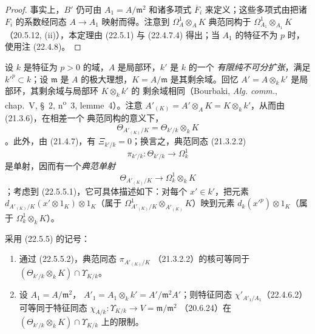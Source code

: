 \begin{proof}
事实上，$B'$ 仍可由 $A_1=A/\mathfrak m^2$ 和诸多项式
$\overline F_i$ 来定义；这些多项式由把诸 $F_i$ 的系数经同态
$A\longrightarrow A_1$ 映射而得。注意到 $\Omega^1_A\otimes_AK$ 典范同构于
$\Omega^1_{A_1}\otimes_{A_1}K$（20.5.12, (ii)），本定理由 (22.5.1)
与 (22.4.7.4) 得出；当 $A_1$ 的特征不为 $p$ 时，使用注 (22.4.8)。
\end{proof}


\begin{env}[22.5.5]
\label{0.22.5.5-fr}
设 $k$ 是特征为 $p>0$ 的域，$A$ 是局部环，$k'$ 是 $k$ 的一个
\emph{有限纯不可分扩张}，满足 $k'^p\subset k$；设 $\mathfrak m$ 是
$A$ 的极大理想，$K=A/\mathfrak m$ 是其剩余域。回忆
$A'=A\otimes_kk'$ 是局部环，其剩余域与局部环 $K\otimes_kk'$ 的
剩余域相同（Bourbaki, \emph{Alg. comm.}, chap.~V, §~2,
n\textsuperscript{o}~3, lemme~4）。注意
$A'_{(K)}=A'\otimes_AK=K\otimes_kk'$，从而由 (21.3.6)，在相差一个
典范同构的意义下，
\begin{equation}
\label{0.22.5.5.1-fr}
  \Theta_{A'_{(K)}/K}=\Theta_{k'/k}\otimes_kK
  \tag{22.5.5.1}
\end{equation}
。此外，由 (21.4.7)，有 $\Xi_{k'/k}=0$；换言之，典范同态
(21.3.2.2)
\[
  \pi_{k'/k}:\Theta_{k'/k}\longrightarrow\Omega^1_k
\]
是单射，因而有一个\emph{典范单射}
\begin{equation}
\label{0.22.5.5.2-fr}
  \Theta_{A'_{(K)}/K}\longrightarrow\Omega^1_k\otimes_kK
  \tag{22.5.5.2}
\end{equation}
；考虑到 (22.5.5.1)，它可具体描述如下：对每个 $x'\in k'$，把元素
$d_{A'_{(K)}/K}(x'\otimes1_K)\otimes1_K$（属于
$\Omega^1_{A'_{(K)}/K}\otimes_{A'_{(K)}}K$）映到元素
$d_k(x'^p)\otimes1_K$（属于 $\Omega^1_k\otimes_kK$）。
\end{env}

\begin{lemma}[22.5.6]
\label{0.22.5.6-fr}
采用 (22.5.5) 的记号：
\begin{enumerate}
  \item[\rm(i)] 通过 (22.5.5.2)，典范同态 $\pi_{A'_{(K)}/K}$
  （21.3.2.2）的核可等同于
  $(\Theta_{k'/k}\otimes_kK)\cap\Upsilon_{K/k}$。
  \item[\rm(ii)] 设 $A_1=A/\mathfrak m^2$，
  $A'_1=A_1\otimes_kk'=A'/\mathfrak m^2A'$；则特征同态
  $\chi'_{A'_1/A_1}$（22.4.6.2）可等同于特征同态
  $\chi_{A/k}:\Upsilon_{K/k}\longrightarrow V=\mathfrak m/\mathfrak m^2$
  （20.6.24）在
  $(\Theta_{k'/k}\otimes_kK)\cap\Upsilon_{K/k}$ 上的限制。
\end{enumerate}
\end{lemma}

